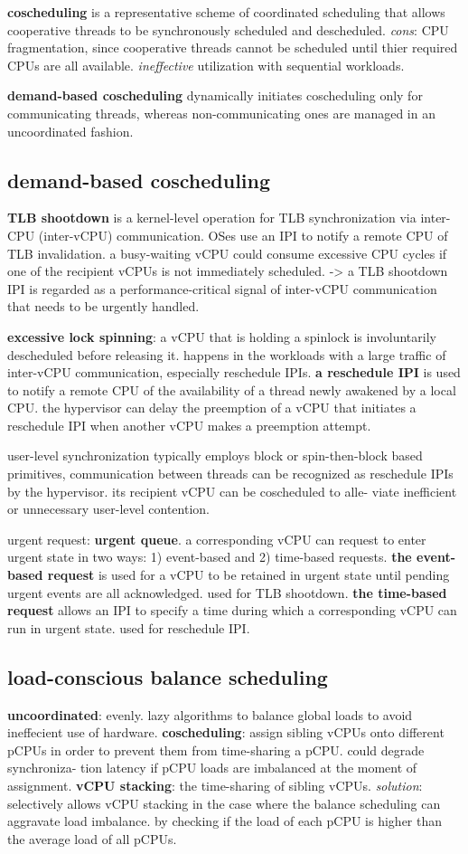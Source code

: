 \documentclass[9pt,conference]{IEEEtran}
\begin{document}
\textbf{coscheduling} is a representative scheme of coordinated scheduling
that allows cooperative threads to be synchronously scheduled and descheduled.
\emph{cons}: CPU fragmentation, since cooperative threads cannot be
scheduled until thier required CPUs are all available.
\emph{ineffective} utilization with sequential workloads.

\textbf{demand-based coscheduling} dynamically initiates coscheduling
only for communicating threads,
whereas non-communicating ones are managed in an uncoordinated fashion.
\subsection{demand-based coscheduling}
\label{sec-11-2}
\textbf{TLB shootdown} is a kernel-level operation for TLB synchronization via inter-CPU (inter-vCPU) communication.
OSes use an IPI to notify a remote CPU of TLB invalidation.
a busy-waiting vCPU could consume excessive CPU cycles if one of the recipient vCPUs is not immediately scheduled.
-> a TLB shootdown IPI is regarded as a performance-critical signal of inter-vCPU communication that needs to be urgently handled.

\textbf{excessive lock spinning}: a vCPU that is holding a spinlock is involuntarily descheduled before releasing it.
happens in the workloads with a large traffic of inter-vCPU communication, especially reschedule IPIs.
\textbf{a reschedule IPI} is used to notify a remote CPU of the availability of a thread newly awakened by a local CPU.
the hypervisor can delay the preemption of a vCPU that initiates a reschedule IPI when another vCPU makes a preemption attempt.

user-level synchronization typically employs block or spin-then-block based primitives, communication between threads can be recognized as reschedule IPIs by the hypervisor.
its recipient vCPU can be coscheduled to alle- viate inefficient or unnecessary user-level contention.

urgent request: \textbf{urgent queue}.
a corresponding vCPU can request to enter urgent state in two ways: 1) event-based and 2) time-based requests.
\textbf{the event-based request} is used for a vCPU to be retained in urgent state until pending urgent events are all acknowledged.
used for TLB shootdown.
\textbf{the time-based request} allows an IPI to specify a time during which a corresponding vCPU can run in urgent state.
used for reschedule IPI.
\subsection{load-conscious balance scheduling}
\label{sec-11-3}
\textbf{uncoordinated}: evenly. lazy algorithms to balance global loads to avoid ineffecient use of hardware.
\textbf{coscheduling}: assign sibling vCPUs onto different pCPUs in order to prevent them from time-sharing a pCPU.
could degrade synchroniza- tion latency if pCPU loads are imbalanced at the moment of assignment.
\textbf{vCPU stacking}: the time-sharing of sibling vCPUs.
\emph{solution}: selectively allows vCPU stacking in the case where the balance scheduling can aggravate load imbalance.
by checking if the load of each pCPU is higher than the average load of all pCPUs.
\end{document}
